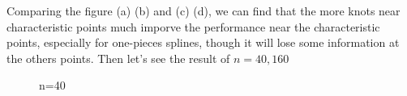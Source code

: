\documentclass{article}
\begin{document}
Comparing the figure (a) (b) and (c) (d), we can find that the more knots near characteristic points much imporve the performance near the characteristic points, especially for one-pieces splines, though it will lose some information at the others points. Then let's see the result of $n = 40, 160$

\begin{figure}[h]
    \centering
    \caption{n=40}
\end{figure}
\end{document}
